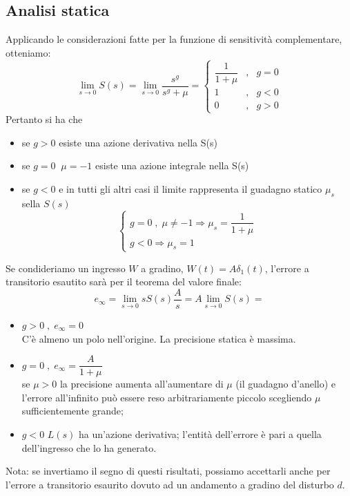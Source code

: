 \documentclass[a4paper]{report}
\begin{document}
\subsection{Analisi statica}
Applicando le considerazioni fatte per la funzione di sensitivit\`a
complementare, otteniamo:
\[
\lim_{s \to 0} S(s) = \lim_{s \to 0} \dfrac{s^g}{s^g + \mu} =
\left\{
\begin{array}{cll}
  \dfrac{1}{1 + \mu} &,& g = 0\\
  1 &,& g < 0\\
  0 &,& g > 0
\end{array}
\right.
\]
Pertanto si ha che
\begin{itemize}
\item se $g > 0$ esiste una azione derivativa nella S(s)
\item se $g = 0\;\;\mu = -1$ esiste una azione integrale nella S(s)
\item se $g < 0$ e in tutti gli altri casi il limite rappresenta il
  guadagno statico $\mu_s$ sella $S(s)$
  \[
  \left\{
  \begin{array}{l}
    g = 0\;,\;\mu \neq -1 \Rightarrow \mu_s = \dfrac{1}{1 +
      \mu}\\
    g < 0 \Rightarrow \mu_s = 1
  \end{array}
  \right.
  \]
\end{itemize}
Se condideriamo un ingresso $W$ a gradino, $W(t) = A \delta_1(t)$,
l'errore a transitorio esautito sar\`a per il teorema del valore
finale:
\[
e_{\infty} = \lim_{s \to 0} s S(s) \dfrac{A}{s} = A \lim_{s \to 0}
  S(s) =
\]
\begin{itemize}
\item $g > 0 \;,\; e_{\infty} = 0$ \\
  C'\`e almeno un polo nell'origine. La precisione statica \`e
  massima.
\item $g = 0\;,\; e_{\infty} = \dfrac{A}{1 + \mu}$\\
  se $\mu > 0$ la precisione aumenta all'aumentare di $\mu$ (il
  guadagno d'anello) e l'errore all'infinito pu\`o essere reso
  arbitrariamente piccolo scegliendo $\mu$ sufficientemente grande;  
\item $g < 0$ $L(s)$ ha un'azione derivativa; l'entit\`a dell'errore
  \`e pari a quella dell'ingresso che lo ha generato.
\end{itemize}
Nota: se invertiamo il segno di questi risultati, possiamo accettarli
anche per l'errore a transitorio esaurito dovuto ad un andamento a
gradino del disturbo $d$.
\end{document}
